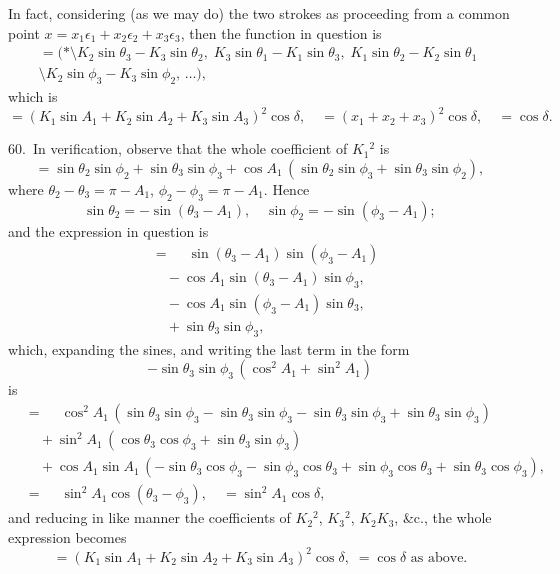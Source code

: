 \documentclass[12pt,a4paper]{article}
\theoremstyle{definition}
\begin{document}
In fact, considering (as we may do) the two strokes as proceeding from a common
point $x = x_1 \epsilon_1 + x_2 \epsilon_2 + x_3 \epsilon_3$, then the function in question is
\begin{multline*}
= (*\!\mathbin{\!\!\setminus\!\!}K_2 \sin \theta_3 - K_3 \sin \theta_2,\;
K_3 \sin \theta_1 - K_1 \sin \theta_3,\;
K_1 \sin \theta_2 - K_2 \sin \theta_1\;\\
\mathbin{\!\!\setminus\!\!}
K_2 \sin \phi_3 - K_3 \sin \phi_2,\, \ldots),
\end{multline*}
which is
\[
= (K_1 \sin A_1 + K_2 \sin A_2 + K_3 \sin A_3)^2 \cos \delta,
\quad = (x_1 + x_2 + x_3)^2 \cos \delta, \quad = \cos \delta.
\]

60.\ In verification, observe that the whole coefficient of $K_1{}^2$ is
\[
= \sin \theta_2 \sin \phi_2 + \sin \theta_3 \sin \phi_3
+ \cos A_1 \, (\sin \theta_2 \sin \phi_3 + \sin \theta_3 \sin \phi_2),
\]
where $\theta_2 - \theta_3 = \pi - A_1$, $\phi_2 - \phi_3 = \pi - A_1$. Hence
\[
\sin \theta_2 = -\sin(\theta_3 - A_1), \quad \sin \phi_2 = -\sin(\phi_3 - A_1);
\]
and the expression in question is
\begin{align*}
&= \phantom{+} \sin(\theta_3 - A_1) \sin(\phi_3 - A_1)\\
&\quad - \cos A_1 \sin(\theta_3 - A_1) \sin \phi_3,\\
&\quad - \cos A_1 \sin(\phi_3 - A_1) \sin \theta_3,\\
&\quad + \sin \theta_3 \sin \phi_3,
\end{align*}
which, expanding the sines, and writing the last term in the form
\[
-\sin \theta_3 \sin \phi_3 \, (\cos^2 A_1 + \sin^2 A_1)
\]
is
\begin{align*}
&= \phantom{+} \cos^2 A_1 \, (\sin \theta_3 \sin \phi_3 - \sin \theta_3 \sin \phi_3
- \sin \theta_3 \sin \phi_3 + \sin \theta_3 \sin \phi_3)\\
&\quad + \sin^2 A_1 \, (\cos \theta_3 \cos \phi_3 + \sin \theta_3 \sin \phi_3)\\
&\quad + \cos A_1 \sin A_1 \,
(-\sin \theta_3 \cos \phi_3 - \sin \phi_3 \cos \theta_3
+ \sin \phi_3 \cos \theta_3 + \sin \theta_3 \cos \phi_3),\\
&= \phantom{+} \sin^2 A_1 \cos(\theta_3 - \phi_3), \quad = \sin^2 A_1 \cos \delta,
\end{align*}
and reducing in like manner the coefficients of $K_2{}^2$, $K_3{}^2$, $K_2 K_3$, \&c.,
the whole expression becomes
\[
= (K_1 \sin A_1 + K_2 \sin A_2 + K_3 \sin A_3)^2 \cos \delta,
\; = \cos \delta \text{ as above}.
\]
\end{document}

